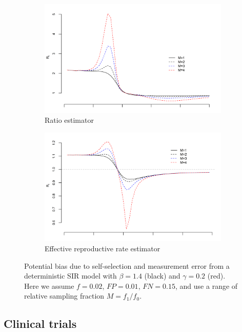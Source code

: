 \documentclass[aoas]{amsart}
\begin{document}
\begin{figure}
\centering
\begin{subfigure}{.5\textwidth}
  \centering
  \includegraphics[width=.9\linewidth]{../methods/figs/sir_ratio.png}
  \caption{Ratio estimator}
  \label{fig:ratio-bias}
\end{subfigure}%
\begin{subfigure}{.5\textwidth}
  \centering
  \includegraphics[width=.9\linewidth]{../methods/figs/sir_rt.png}
  \caption{Effective reproductive rate estimator}
  \label{fig:r0-bias}
\end{subfigure}
\caption{Potential bias due to self-selection and measurement error from a deterministic SIR model with $\beta = 1.4$ (black) and $\gamma = 0.2$ (red).  Here we assume $f = 0.02$, $FP = 0.01$, $FN = 0.15$, and use a range of relative sampling fraction $M = f_1/f_0$.}
\label{fig:rates}
\end{figure}

\subsection{Clinical trials}
\end{document}

